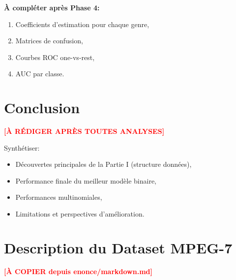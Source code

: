 \documentclass[11pt,a4paper,french]{report}
\begin{document}
\textbf{À compléter après Phase 4:}

\begin{enumerate}
    \item Coefficients d'estimation pour chaque genre,
    \item Matrices de confusion,
    \item Courbes ROC one-vs-rest,
    \item AUC par classe.
\end{enumerate}


\chapter*{Conclusion}

\textcolor{red}{\textbf{[À RÉDIGER APRÈS TOUTES ANALYSES]}}

Synthétiser:
\begin{itemize}
    \item Découvertes principales de la Partie I (structure données),
    \item Performance finale du meilleur modèle binaire,
    \item Performances multinomiales,
    \item Limitations et perspectives d'amélioration.
\end{itemize}


\appendix

\chapter{Description du Dataset MPEG-7}

\textcolor{red}{\textbf{[À COPIER depuis enonce/markdown.md]}}

\end{document}

